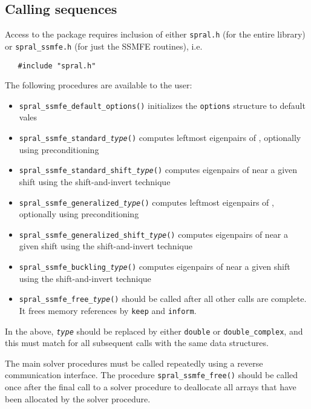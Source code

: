 \subsection{Calling sequences}

\label{sec:call}

Access to the package requires inclusion of either \texttt{spral.h} (for the
entire \spral library) or \texttt{spral\_ssmfe.h} (for just the SSMFE routines), i.e.

\begin{verbatim}
   #include "spral.h"
\end{verbatim}

\medskip

\noindent The following procedures are available to the user:
%
\begin{itemize}
\vspace{-0.1cm}
\item {\tt spral\_ssmfe\_default\_options()} initializes the \texttt{options} structure to default vales
\item {\tt spral\_ssmfe\_standard\_\textit{type}()} 
computes leftmost eigenpairs of , 
optionally using preconditioning
\item {\tt spral\_ssmfe\_standard\_shift\_\textit{type}()} 
computes eigenpairs of  near a given shift
using the shift-and-invert technique
\item {\tt spral\_ssmfe\_generalized\_\textit{type}()} 
computes leftmost eigenpairs of 
, optionally using preconditioning
\item {\tt spral\_ssmfe\_generalized\_shift\_\textit{type}()} 
computes eigenpairs of 
 near a given shift
using the shift-and-invert technique
\item {\tt spral\_ssmfe\_buckling\_\textit{type}()} 
computes eigenpairs of 
 near a given shift
using the shift-and-invert technique
\item {\tt spral\_ssmfe\_free\_\textit{type}()}  should be called after all other calls
are complete. It frees memory references by \texttt{keep} and \texttt{inform}.
%
\end{itemize}

In the above, \texttt{\textit{type}} should be replaced by either \texttt{double} or \texttt{double\_complex}, and this must match for all subsequent calls with the same data structures.

The main solver procedures
must be called repeatedly using
a reverse communication interface.
The procedure \texttt{spral\_ssmfe\_free()}
should be called once after the
final call to 
a solver procedure
to deallocate all arrays 
that have been allocated by
the solver procedure.

